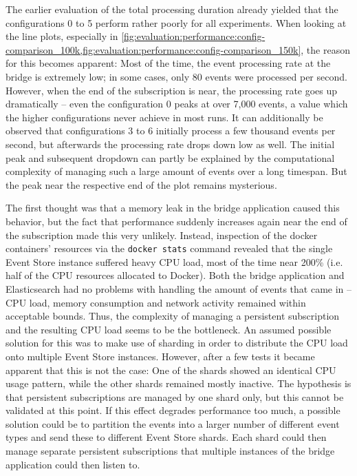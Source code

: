 The earlier evaluation of the total processing duration already yielded that the configurations 0 to 5 perform rather poorly for all experiments.
When looking at the line plots, especially in \cref{fig:evaluation:performance:config-comparison_100k,fig:evaluation:performance:config-comparison_150k}, the reason for this becomes apparent:
Most of the time, the event processing rate at the bridge is extremely low; in some cases, only 80 events were processed per second.
However, when the end of the subscription is near, the processing rate goes up dramatically -- even the configuration 0 peaks at over 7,000 events, a value which the higher configurations never achieve in most runs.
It can additionally be observed that configurations 3 to 6 initially process a few thousand events per second, but afterwards the processing rate drops down low as well.
The initial peak and subsequent dropdown can partly be explained by the computational complexity of managing such a large amount of events over a long timespan.
But the peak near the respective end of the plot remains mysterious.

The first thought was that a memory leak in the bridge application caused this behavior, but the fact that performance suddenly increases again near the end of the subscription made this very unlikely.
Instead, inspection of the docker containers' resources via the \texttt{docker stats} command revealed that the single Event Store instance suffered heavy CPU load, most of the time near 200\% (i.e. half of the CPU resources allocated to Docker).
Both the bridge application and Elasticsearch had no problems with handling the amount of events that came in -- CPU load, memory consumption and network activity remained within acceptable bounds.
Thus, the complexity of managing a persistent subscription and the resulting CPU load seems to be the bottleneck.
An assumed possible solution for this was to make use of sharding in order to distribute the CPU load onto multiple Event Store instances.
However, after a few tests it became apparent that this is not the case: One of the shards showed an identical CPU usage pattern, while the other shards remained mostly inactive.
The hypothesis is that persistent subscriptions are managed by one shard only, but this cannot be validated at this point.
If this effect degrades performance too much, a possible solution could be to partition the events into a larger number of different event types and send these to different Event Store shards.
Each shard could then manage separate persistent subscriptions that multiple instances of the bridge application could then listen to.

